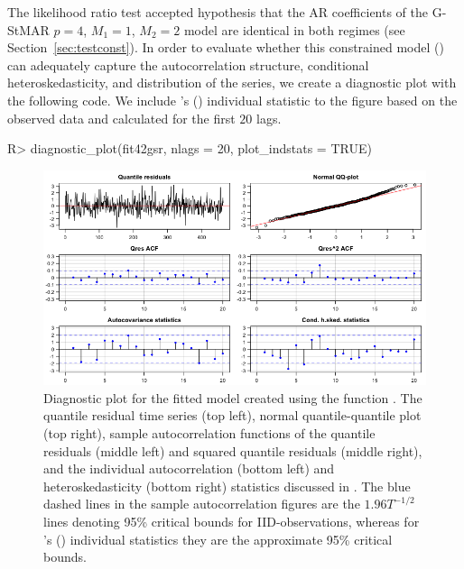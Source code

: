 \documentclass[nojss]{jss} %
\begin{document}
The likelihood ratio test accepted hypothesis that the AR coefficients of the G-StMAR $p=4$, $M_1=1$, $M_2=2$ model are identical in both regimes (see Section~\ref{sec:testconst}). In order to evaluate whether this constrained model () can adequately capture the autocorrelation structure, conditional heteroskedasticity, and distribution of the series, we create a diagnostic plot with the following code. We include \citeauthor{Kalliovirta:2012}'s (\citeyear{Kalliovirta:2012}) individual statistic to the figure based on the observed data and calculated for the first $20$ lags.
%
\begin{CodeChunk}
\begin{CodeInput}
R> diagnostic_plot(fit42gsr, nlags = 20, plot_indstats = TRUE)
\end{CodeInput}
\end{CodeChunk}
%

\begin{figure}[t]
  \centering
  \includegraphics{figures/diagplotfit42gsr.png}
  \caption{Diagnostic plot for the fitted model  created using the function . The quantile residual time series (top left), normal  quantile-quantile plot (top right), sample autocorrelation functions of the quantile residuals (middle left) and squared quantile residuals (middle right), and the individual autocorrelation (bottom left) and heteroskedasticity (bottom right) statistics discussed in \citet[pp. 369-370]{Kalliovirta:2012}. The blue dashed lines in the sample autocorrelation figures are the $1.96T^{-1/2}$ lines denoting 95\% critical bounds for IID-observations, whereas for \citeauthor{Kalliovirta:2012}'s (\citeyear{Kalliovirta:2012}) individual statistics they are the approximate 95\% critical bounds.}
\label{fig:diagplotfit42gs}
\end{figure}
\end{document}
